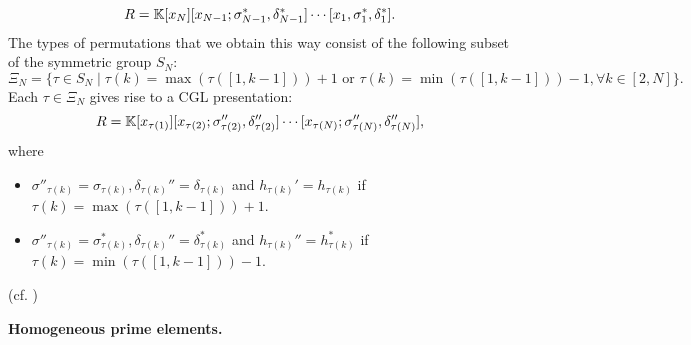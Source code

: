 \begin{equation*}
	R = \mathbb{K}[x_N][x_{N-1}; \sigma_{N-1}^*, \delta_{N-1}^*]\cdots [x_1, \sigma_1^*, \delta_1^*].
\end{equation*}
%
The types of permutations that we obtain this way consist of the following subset of
the symmetric group $S_N$:
\begin{equation*}
	\Xi_N = \{\tau \in S_N \mid \tau(k) = \max (\tau ([1, k-1])) + 1 \text{ or } \tau(k) = \min (\tau ([1, k-1])) - 1, \forall k \in [2, N]\}.
\end{equation*}
%
Each $\tau \in \Xi_N$ gives rise to a CGL presentation:
\begin{equation*}
	R = \mathbb{K}[x_{\tau(1)}][x_{\tau(2)}; \sigma_{\tau(2)}'', \delta_{\tau(2)}''] \cdots [x_{\tau(N)}; \sigma_{\tau(N)}'', \delta_{\tau(N)}''],
\end{equation*}
%
where
\begin{itemize}
	\item $\sigma''_{\tau(k)} = \sigma_{\tau(k)}, \delta_{\tau(k)}'' = \delta_{\tau(k)}$
	      and $h_{\tau(k)}' = h_{\tau(k)}$ if $\tau(k) = \max(\tau([1,k-1])) + 1$.
	\item
	      $\sigma''_{\tau(k)} = \sigma^*_{\tau(k)}, \delta_{\tau(k)}'' = \delta^*_{\tau(k)}$ and
	      $h_{\tau(k)}'' = h_{\tau(k)}^*$ if $\tau(k) = \min(\tau([1,k-1])) - 1$.
\end{itemize}
(cf. \cite[Proposition 3.14]{GoodearlYakimov2017QCA})

\textbf{Homogeneous prime elements.}

